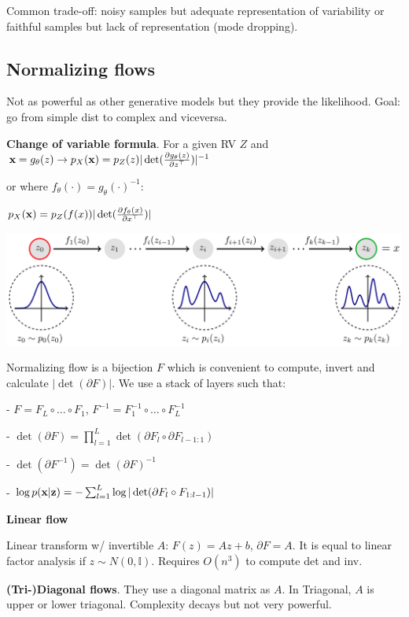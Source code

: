 Common trade-off: noisy samples but adequate representation of variability or faithful samples but lack of representation (mode dropping).

\subsection*{Normalizing flows}
Not as powerful as other generative models but they provide the likelihood. Goal: go from simple dist to complex and viceversa.

\textbf{Change of variable formula}. For a given RV $Z$ and $\mathbf{x}=g_\theta(z) \to p_X(\mathbf{x}) = p_Z(z) |\det(\frac{\partial g_\theta(z)}{\partial z^\top})|^{-1}$

or where $f_\theta(\cdot) = g_\theta(\cdot)^{-1}$: 

$p_X(\mathbf{x}) = p_Z(f(x))|\det(\frac{\partial f_\theta(x)}{\partial x^\top})|$

\includegraphics[width=\columnwidth]{src/normflows.png}

Normalizing flow is a bijection $F$ which is convenient to compute, invert and calculate $|\det(\partial F)|$. We use a stack of layers such that: 

- $F = F_L \circ \hdots \circ F_1$, $F^{-1} = F_1^{-1} \circ \hdots \circ F_L^{-1}$

- $\det(\partial F) = \prod_{l=1}^L \det(\partial F_l \circ \partial F_{l-1: 1})$

- $\det(\partial F^{-1}) = \det(\partial F)^{-1}$

- $\log p(\mathbf{x}|\mathbf{z}) = -\sum_{l=1}^L \log|\det(\partial F_l \circ F_{1:l-1})|$

\textbf{Linear flow}

Linear transform w/ invertible $A$: $F(z) = Az + b$, $\partial F = A$. It is equal to linear factor analysis if $z \sim N(0, \mathbb{I})$. Requires $O(n^3)$ to compute det and inv.

\textbf{(Tri-)Diagonal flows}. They use a diagonal matrix as $A$. In Triagonal, $A$ is upper or lower triagonal. Complexity decays but not very powerful.